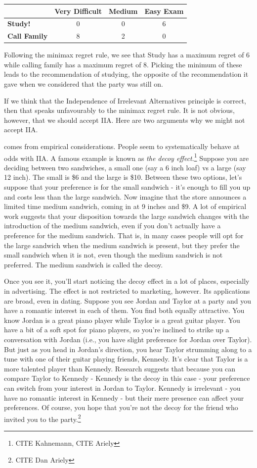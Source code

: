\documentclass[]{tufte-book}
\begin{document}
\begin{longtable}[]{@{}lccc@{}}
\toprule
& Very Difficult & Medium & Easy Exam\tabularnewline
\midrule
\endhead
\textbf{Study!} & 0 & 0 & 6\tabularnewline
\textbf{Call Family} & 8 & 2 & 0\tabularnewline
\bottomrule
\end{longtable}

Following the minimax regret rule, we see that Study has a maximum regret of 6 while calling family has a maximum regret of 8. Picking the minimum of these leads to the recommendation of studying, the opposite of the recommendation it gave when we considered that the party was still on.

If we think that the Independence of Irrelevant Alternatives principle is correct, then that speaks unfavourably to the minimax regret rule. It is not obvious, however, that we should accept IIA. Here are two arguments why we might not accept IIA.

 comes from empirical considerations. People seem to systematically behave at odds with IIA. A famous example is known as \emph{the decoy effect}.\footnote{CITE Kahnemann, CITE Ariely} Suppose you are deciding between two sandwiches, a small one (say a 6 inch loaf) vs a large (say 12 inch). The small is \$6 and the large is \$10. Between these two options, let's suppose that your preference is for the small sandwich - it's enough to fill you up and costs less than the large sandwich. Now imagine that the store announces a limited time medium sandwich, coming in at 9 inches and \$9. A lot of empirical work suggests that your disposition towards the large sandwich changes with the introduction of the medium sandwich, even if you don't actually have a preference for the medium sandwich. That is, in many cases people will opt for the large sandwich when the medium sandwich is present, but they prefer the small sandwich when it is not, even though the medium sandwich is not preferred. The medium sandwich is called the decoy.

Once you see it, you'll start noticing the decoy effect in a lot of places, especially in advertising. The effect is not restricted to marketing, however. Its applications are broad, even in dating. Suppose you see Jordan and Taylor at a party and you have a romantic interest in each of them. You find both equally attractive. You know Jordan is a great piano player while Taylor is a great guitar player. You have a bit of a soft spot for piano players, so you're inclined to strike up a conversation with Jordan (i.e., you have slight preference for Jordan over Taylor). But just as you head in Jordan's direction, you hear Taylor strumming along to a tune with one of their guitar playing friends, Kennedy. It's clear that Taylor is a more talented player than Kennedy. Research suggests that because you can compare Taylor to Kennedy - Kennedy is the decoy in this case - your preference can switch from your interest in Jordan to Taylor. Kennedy is irrelevant - you have no romantic interest in Kennedy - but their mere presence can affect your preferences. Of course, you hope that you're not the decoy for the friend who invited you to the party.\footnote{CITE Dan Ariely}
\end{document}
